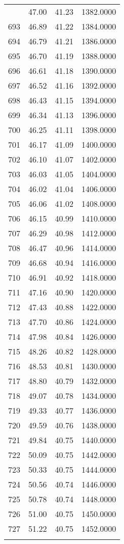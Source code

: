 \documentclass[
  captions=tableheading,
]{scrartcl}
\begin{document}
\begin{longtable} {l|l|l|l}
{692	& 47.00	& 41.23	& 1382.0000\\
693	& 46.89	& 41.22	& 1384.0000\\
694	& 46.79	& 41.21	& 1386.0000\\
695	& 46.70	& 41.19	& 1388.0000\\
696	& 46.61	& 41.18	& 1390.0000\\
697	& 46.52	& 41.16	& 1392.0000\\
698	& 46.43	& 41.15	& 1394.0000\\
699	& 46.34	& 41.13	& 1396.0000\\
700	& 46.25	& 41.11	& 1398.0000\\
701	& 46.17	& 41.09	& 1400.0000\\
702	& 46.10	& 41.07	& 1402.0000\\
703	& 46.03	& 41.05	& 1404.0000\\
704	& 46.02	& 41.04	& 1406.0000\\
705	& 46.06	& 41.02	& 1408.0000\\
706	& 46.15	& 40.99	& 1410.0000\\
707	& 46.29	& 40.98	& 1412.0000\\
708	& 46.47	& 40.96	& 1414.0000\\
709	& 46.68	& 40.94	& 1416.0000\\
710	& 46.91	& 40.92	& 1418.0000\\
711	& 47.16	& 40.90	& 1420.0000\\
712	& 47.43	& 40.88	& 1422.0000\\
713	& 47.70	& 40.86	& 1424.0000\\
714	& 47.98	& 40.84	& 1426.0000\\
715	& 48.26	& 40.82	& 1428.0000\\
716	& 48.53	& 40.81	& 1430.0000\\
717	& 48.80	& 40.79	& 1432.0000\\
718	& 49.07	& 40.78	& 1434.0000\\
719	& 49.33	& 40.77	& 1436.0000\\
720	& 49.59	& 40.76	& 1438.0000\\
721	& 49.84	& 40.75	& 1440.0000\\
722	& 50.09	& 40.75	& 1442.0000\\
723	& 50.33	& 40.75	& 1444.0000\\
724	& 50.56	& 40.74	& 1446.0000\\
725	& 50.78	& 40.74	& 1448.0000\\
726	& 51.00	& 40.75	& 1450.0000\\
727	& 51.22	& 40.75	& 1452.0000\\
}
\end{longtable}
\end{document}
